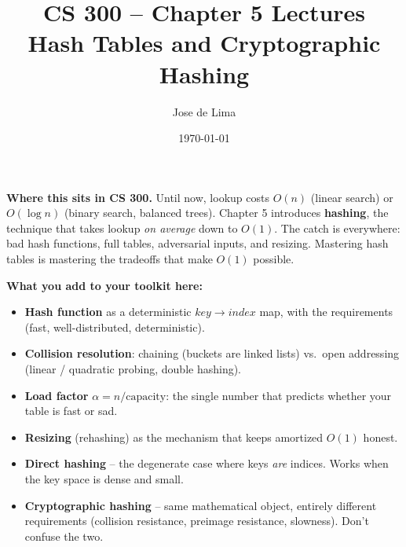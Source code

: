 \documentclass[11pt]{article}
\title{CS 300 -- Chapter 5 Lectures\\\large Hash Tables and Cryptographic Hashing}
\author{Jose de Lima}
\date{\today}
\begin{document}
\maketitle

\begin{ideabox}
\textbf{Where this sits in CS 300.} Until now, lookup costs $O(n)$
(linear search) or $O(\log n)$ (binary search, balanced trees). Chapter 5
introduces \textbf{hashing}, the technique that takes lookup \emph{on
average} down to $O(1)$. The catch is everywhere: bad hash functions,
full tables, adversarial inputs, and resizing. Mastering hash tables is
mastering the tradeoffs that make $O(1)$ possible.

\textbf{What you add to your toolkit here:}
\begin{itemize}
    \item \textbf{Hash function} as a deterministic $key \to index$ map,
          with the requirements (fast, well-distributed, deterministic).
    \item \textbf{Collision resolution}: chaining (buckets are linked
          lists) vs.\ open addressing (linear / quadratic probing,
          double hashing).
    \item \textbf{Load factor} $\alpha = n / \text{capacity}$: the single
          number that predicts whether your table is fast or sad.
    \item \textbf{Resizing} (rehashing) as the mechanism that keeps
          amortized $O(1)$ honest.
    \item \textbf{Direct hashing} -- the degenerate case where keys
          \emph{are} indices. Works when the key space is dense and
          small.
    \item \textbf{Cryptographic hashing} -- same mathematical object,
          entirely different requirements (collision resistance,
          preimage resistance, slowness). Don't confuse the two.
\end{itemize}


\end{ideabox}
\end{document}
